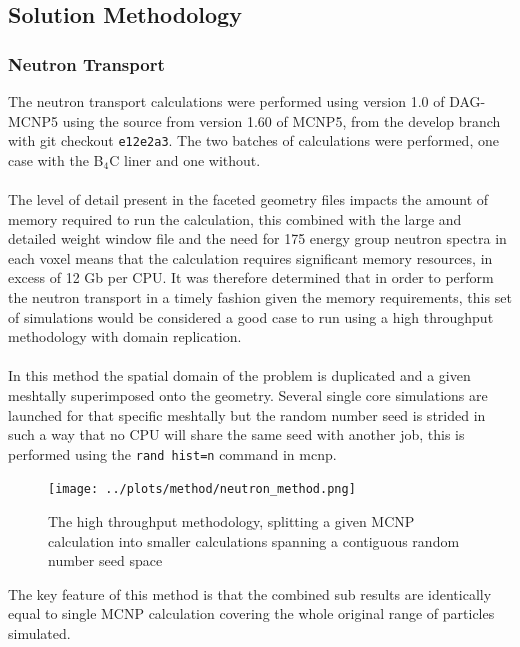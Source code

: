 \documentclass[12pt]{article}
\begin{document}
\subsection{Solution Methodology}
\subsubsection{Neutron Transport}
The neutron transport calculations were performed using version 1.0 of DAG-MCNP5
using the source from version 1.60 of MCNP5, from the develop branch with git
checkout \texttt{e12e2a3}. The two batches of calculations were performed, one
case with the B$_4$C liner and one without.
\\
\\
The level of detail present in the faceted geometry files impacts the amount of
memory required to run the calculation, this combined with the large and
detailed weight window file and the need for 175 energy group neutron spectra
in each voxel means that the calculation requires significant memory resources,
in excess of 12 Gb per CPU. It was therefore determined that in order to perform
the neutron transport in a timely fashion given the memory requirements, this
set of simulations would be considered a good case to run using a high
throughput methodology with domain replication.
\\
\\
In this method the spatial domain of the problem is duplicated and a given
meshtally superimposed onto the geometry. Several single core simulations are
launched for that specific meshtally but the random number seed is strided in
such a way that no CPU will share the same seed with another job, this is
performed using the \texttt{rand hist=n} command in \gls{mcnp}.
\begin{figure}[ht!]
  \centering
  \texttt{[image: ../plots/method/neutron\_method.png]}
  \caption{The high throughput methodology, splitting a given MCNP calculation
           into smaller calculations spanning a contiguous random number seed
           space}
  \label{fig:mesh_spliting}
\end{figure}
The key feature of this method is that the combined sub results are identically
equal to single MCNP calculation covering the whole original range of particles
simulated.
\end{document}
